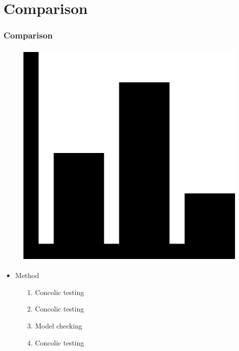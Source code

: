 \documentclass{beamer}
\begin{document}
	
	\section{Comparison}
	
	\begin{frame}
		\frametitle{Comparison}
		
		\begin{figure}[htbp]
			\centering
			\includegraphics[scale=0.1]{comparison}
		\end{figure}
		
		\begin{itemize}
			\item Method
			\begin{itemize}
				\color{Paper1Full}  \item[1.] Concolic testing
				\color{Paper2Full}  \item[2.] Concolic testing
				\color{Paper3Full}  \item[3.] Model checking
				\color{Paper4Full}  \item[4.] Concolic testing
			\end{itemize}
		\end{itemize}
	\end{frame}
	
\end{document}
